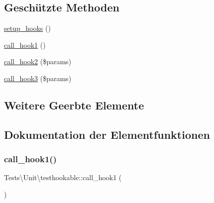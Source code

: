 \subsection*{Geschützte Methoden}
\begin{DoxyCompactItemize}
\item 
\hyperlink{classTests_1_1Unit_1_1testhookable_adc78f721d8fe79ed1846b566fd336321}{setup\+\_\+hooks} ()
\item 
\hyperlink{classTests_1_1Unit_1_1testhookable_a15b77da957379837365b9c49909696e2}{call\+\_\+hook1} ()
\item 
\hyperlink{classTests_1_1Unit_1_1testhookable_a8644ac0e651392297e1c75fb30928a0f}{call\+\_\+hook2} (\$params)
\item 
\hyperlink{classTests_1_1Unit_1_1testhookable_acc31f8ea4bd5520f4232849a961d6487}{call\+\_\+hook3} (\$params)
\end{DoxyCompactItemize}
\subsection*{Weitere Geerbte Elemente}


\subsection{Dokumentation der Elementfunktionen}
\mbox{\label{classTests_1_1Unit_1_1testhookable_a15b77da957379837365b9c49909696e2}} 
\subsubsection{\texorpdfstring{call\+\_\+hook1()}{call\_hook1()}}
{\footnotesize\ttfamily Tests\textbackslash{}\+Unit\textbackslash{}testhookable\+::call\+\_\+hook1 (\begin{DoxyParamCaption}{ }\end{DoxyParamCaption})\hspace{0.3cm}{\ttfamily [protected]}}

\mbox{\label{classTests_1_1Unit_1_1testhookable_a8644ac0e651392297e1c75fb30928a0f}} 
